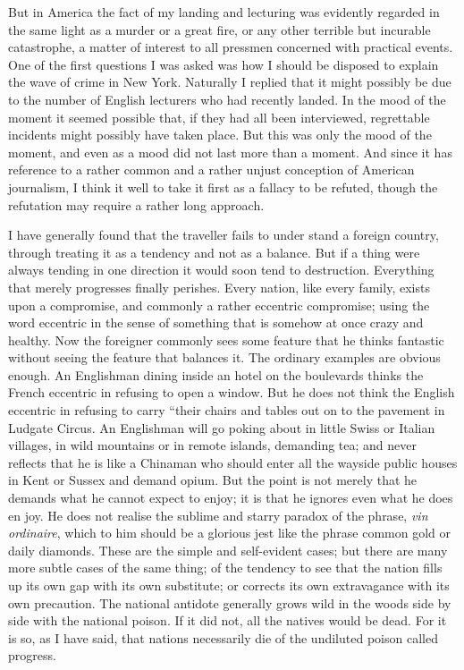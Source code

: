 \documentclass{book}
\begin{document}
But in America the fact of my landing and lecturing was evidently regarded in the same light as a murder or a great fire, or any other terrible but incurable catastrophe, a matter of interest to all pressmen concerned with practical events. One of the first questions I was asked was how I should be disposed to explain the wave of crime in New York. Naturally I replied that it might possibly be due to the number of English lecturers who had recently landed. In the mood of the moment it seemed possible that, if they had all been interviewed, regrettable incidents might possibly have taken place. But this was only the mood of the moment, and even as a mood did not last more than a moment. And since it has reference to a rather common and a rather unjust conception of American journalism, I think it well to take it first as a fallacy to be refuted, though the refutation may require a rather long approach.

I have generally found that the traveller fails to under stand a foreign country, through treating it as a tendency and not as a balance. But if a thing were always tending in one direction it would soon tend to destruction. Everything that merely progresses finally perishes. Every nation, like every family, exists upon a compromise, and commonly a rather eccentric compromise; using the word eccentric in the sense of something that is somehow at once crazy and healthy. Now the foreigner commonly sees some feature that he thinks fantastic without seeing the feature that balances it. The ordinary examples are obvious enough. An Englishman dining inside an hotel on the boulevards thinks the French eccentric in refusing to open a window. But he does not think the English eccentric in refusing to carry “their chairs and tables out on to the pavement in Ludgate Circus. An Englishman will go poking about in little Swiss or Italian villages, in wild mountains or in remote islands, demanding tea; and never reflects that he is like a Chinaman who should enter all the wayside public houses in Kent or Sussex and demand opium. But the point is not merely that he demands what he cannot expect to enjoy; it is that he ignores even what he does en joy. He does not realise the sublime and starry paradox of the phrase, \emph{vin ordinaire}, which to him should be a glorious jest like the phrase common gold or daily diamonds. These are the simple and self-evident cases; but there are many more subtle cases of the same thing; of the tendency to see that the nation fills up its own gap with its own substitute; or corrects its own extravagance with its own precaution. The national antidote generally grows wild in the woods side by side with the national poison. If it did not, all the natives would be dead. For it is so, as I have said, that nations necessarily die of the undiluted poison called progress.
\end{document}
